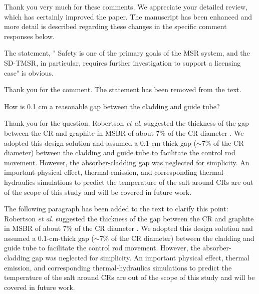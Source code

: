 \documentclass[answers,11pt]{exam}
\begin{document}
\begin{questions}
        \begin{solution}
        	 Thank you very much for these comments. We appreciate your detailed review, which has certainly improved the paper. The manuscript has been enhanced and more detail is described regarding these changes in the specific comment responses below.
        	

        \end{solution}

        \question  The statement, " Safety is one of the primary goals of the MSR system, and the SD-TMSR, in particular, requires further investigation to support a licensing case" is obvious.
        
        \begin{solution}
             
              Thank you for the comment. The statement has been removed from the text.
              
        \end{solution}

        \question How is 0.1 cm a reasonable gap between the cladding and guide tube?
        \begin{solution}
        	
Thank you for the question. Robertson \emph{et al.} suggested the thickness of the gap between the CR and graphite in MSBR of about 7\% of the CR diameter \cite{robertson_conceptual_1971}. We adopted this design solution and assumed a 0.1-cm-thick gap ($\sim$7\% of the CR diameter) between the cladding and guide tube to facilitate the control rod movement. However, the absorber-cladding gap was neglected for simplicity. An important physical effect, thermal emission, and corresponding thermal-hydraulics simulations to predict the temperature of the salt around CRs are out of the scope of this study and will be covered in future work.

The following paragraph has been added to the text to clarify this point:\\

Robertson \emph{et al.} suggested the thickness of the gap between the CR and graphite in MSBR of about 7\% of the CR diameter \cite{robertson_conceptual_1971}. We adopted this design solution and assumed a 0.1-cm-thick gap ($\sim$7\% of the CR diameter) between the cladding and guide tube to facilitate the control rod movement. However, the absorber-cladding gap was neglected for simplicity. An important physical effect, thermal emission, and corresponding thermal-hydraulics simulations to predict the temperature of the salt around CRs are out of the scope of this study and will be covered in future work.




\end{solution}
\end{questions}
\end{document}
